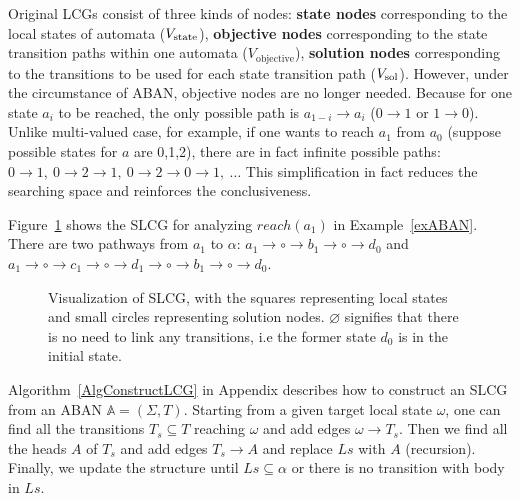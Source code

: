 \begin{remark}\label{remark:SLCG}
Original LCGs consist of three kinds of nodes: \textbf{state nodes} corresponding to the local states of automata ($V_{\mathrm{state}}$), \textbf{objective nodes} corresponding to the state transition paths within one automata {\rm($V_{\mathrm{objective}}$)}, \textbf{solution nodes} corresponding to the transitions to be used for each state transition path ($V_{\mathrm{sol}}$).
However, under the circumstance of ABAN, objective nodes are no longer needed.
Because for one state $a_i$ to be reached, the only possible path is $a_{1-i}\to a_i$ ($0\to1 $ or $1\to 0$).
Unlike multi-valued case, for example, if one wants to reach $a_1$ from $a_0$ (suppose possible states for $a$ are 0,1,2), there are in fact infinite possible paths: $0\to 1,\ 0\to 2 \to 1,\ 0 \to 2 \to 0 \to 1,\ \ldots$
This simplification in fact reduces the searching space and reinforces the conclusiveness.
\end{remark}

\begin{example}
    Figure~\ref{LCGexample} shows the SLCG for analyzing $reach(a_1)$ in Example~\ref{exABAN}.
    There are two pathways from $a_1$ to $\alpha$: $a_1\to \circ\to b_1\to \circ\to d_0$ and $a_1\to \circ\to c_1\to \circ\to d_1\to \circ\to b_1\to \circ \to d_0$.
    \begin{figure}[ht]
        \centering
        
        \caption[Example of SLCG]{Visualization of SLCG, with the squares representing local states and small circles representing solution nodes.
        $\varnothing$ signifies that there is no need to link any transitions, i.e the former state $d_0$ is in the initial state.}
        \label{LCGexample}
    \end{figure}
\end{example}

Algorithm~\ref{AlgConstructLCG} in Appendix describes how to construct an SLCG from an ABAN $\mathbb{A} = (\Sigma,T)$.
Starting from  a given target local state $\omega$, one can find all the transitions $T_s\subseteq T$ reaching $\omega$ and add edges $\omega \to T_s$.
Then we find all the heads $A$ of $T_s$ and add edges $T_s \to A$ and replace $Ls$ with $A$ (recursion).
Finally, we update the structure until $Ls\subseteq \alpha$ or there is no transition with body in $Ls$.

